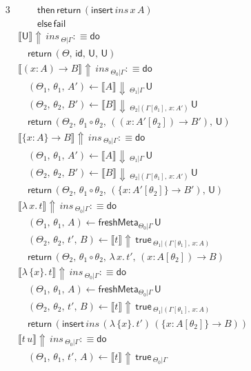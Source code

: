 \documentclass[acmsmall,review,anonymous,prologue,dvipsnames]{acmart}\settopmatter{printfolios=true,printccs=false,printacmref=false}
\renewcommand{\U}{\mathsf{U}}
\newcommand{\id}{\mathsf{id}}
\newcommand{\freshMeta}[3]{\mathsf{freshMeta}_{#1|#2}\,#3}
\newcommand{\fail}{\mathsf{fail}}
\newcommand{\echeck}[4]{\llbracket#1\rrbracket\!\Downarrow\,_{#2|#3}\,#4}
\newcommand{\einfer}[4]{\llbracket#1\rrbracket\!\Uparrow\,#2\,_{#3|#4}}
\newcommand{\edo}{\boldsymbol{\mathsf{do}}}
\newcommand{\ereturn}{\boldsymbol{\mathsf{return}}}
\newcommand{\ethen}{\boldsymbol{\mathsf{then}}}
\newcommand{\eelse}{\boldsymbol{\mathsf{else}}}
\newcommand{\true}{\mathsf{true}}
\newcommand{\einsert}[3]{\mathsf{insert}\,#1\,#2\,#3}
\theoremstyle{remark}
\begin{document}
\begin{alignat*}{3}
  &\qquad   \ethen\, \ereturn\,(\einsert{ins}{x}{A})\\
  &\qquad   \eelse\, \fail\\
  &\einfer{\U}{ins}{\Theta}{\Gamma} :\equiv \edo\\
  &\quad\ereturn\,(\Theta,\,\id,\,\U,\,\U)\\
  &\einfer{(x : A)\to B}{ins}{\Theta_0}{\Gamma} :\equiv \edo\\
  &\quad(\Theta_1,\,\theta_1,\,A') \leftarrow \echeck{A}{\Theta_1}{\Gamma}{\U}\\
  &\quad(\Theta_2,\,\theta_2,\,B') \leftarrow
                 \echeck{B}{\Theta_2}{(\Gamma[\theta_1],\,x : A')}{\U}\\
  &\quad\ereturn\,(\Theta_2,\,\theta_1\circ\theta_2,
                 \,((x : A'[\theta_2])\to B'),\,\U)\\
  &\einfer{\{x : A\}\to B}{ins}{\Theta_0}{\Gamma} :\equiv \edo\\
  &\quad(\Theta_1,\,\theta_1,\,A') \leftarrow \echeck{A}{\Theta_1}{\Gamma}{\U}\\
  &\quad(\Theta_2,\,\theta_2,\,B') \leftarrow
                 \echeck{B}{\Theta_2}{(\Gamma[\theta_1],\,x : A')}{\U}\\
  &\quad\ereturn\,(\Theta_2,\,\theta_1\circ\theta_2,
                 \,(\{x : A'[\theta_2]\}\to B'),\,\U)\\
  &\einfer{\lambda\,x.\,t}{ins}{\Theta_0}{\Gamma} :\equiv \edo \\
  &\quad(\Theta_1,\,\theta_1,\,A)\leftarrow \freshMeta{\Theta_0}{\Gamma}{\U}\\
  &\quad(\Theta_2,\,\theta_2,\,t',\,B)\leftarrow \einfer{t}{\true}{\Theta_1}{(\Gamma[\theta_1],\,x:A)}\\
  &\quad\ereturn\,(\Theta_2,\,\theta_1\circ\theta_2,\,\lambda\,x.\,t',\,(x : A[\theta_2])\to B)\\
  &\einfer{\lambda\,\{x\}.\,t}{ins}{\Theta_0}{\Gamma} :\equiv \edo \\
  &\quad(\Theta_1,\,\theta_1,\,A)\leftarrow \freshMeta{\Theta_0}{\Gamma}{\U}\\
  &\quad(\Theta_2,\,\theta_2,\,t',\,B)\leftarrow \einfer{t}{\true}{\Theta_1}{(\Gamma[\theta_1],\,x:A)}\\
  &\quad\ereturn\,(\einsert{ins}{(\lambda\,\{x\}.\,t')}{(\{x : A[\theta_2]\}\to B)})\\
  &\einfer{t\,u}{ins}{\Theta_0}{\Gamma} :\equiv \edo \\
  &\quad (\Theta_1,\,\theta_1,\,t',\,A) \leftarrow \einfer{t}{\true}{\Theta_0}{\Gamma}\\

\end{alignat*}
\end{document}
